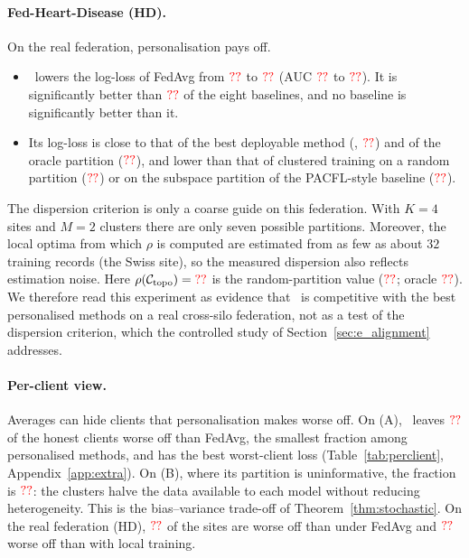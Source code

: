 \paragraph{Fed-Heart-Disease (HD).}
On the real federation, personalisation pays off.
\begin{itemize}[leftmargin=1.2em,itemsep=2pt]
  \item \ptopofl\ lowers the log-loss of FedAvg from $\textcolor{red}{??}$ to $\textcolor{red}{??}$ (AUC
    $\textcolor{red}{??}$ to $\textcolor{red}{??}$). It is significantly better than $\textcolor{red}{??}$ of
    the eight baselines, and no baseline is significantly better than it.
  \item Its log-loss is close to that of the best deployable method (\ResHDBest,
    $\textcolor{red}{??}$) and of the oracle partition ($\textcolor{red}{??}$), and lower than that of
    clustered training on a random partition ($\textcolor{red}{??}$) or on the subspace partition
    of the PACFL-style baseline ($\textcolor{red}{??}$).
\end{itemize}
The dispersion criterion is only a coarse guide on this federation. With $K=4$ sites and
$M=2$ clusters there are only seven possible partitions. Moreover, the local optima from which
$\rho$ is computed are estimated from as few as about $32$ training records (the Swiss site),
so the measured dispersion also reflects estimation noise. Here
$\rho(\mathcal{C}_{\mathrm{topo}})=\textcolor{red}{??}$ is \ResHDRhoCmp{} the random-partition value
($\textcolor{red}{??}$; oracle $\textcolor{red}{??}$). We therefore read this experiment as evidence that
\ptopofl\ is competitive with the best personalised methods on a real cross-silo federation,
not as a test of the dispersion criterion, which the controlled study of
Section~\ref{sec:e_alignment} addresses.

\paragraph{Per-client view.}
Averages can hide clients that personalisation makes worse off. On (A), \ptopofl\ leaves
$\textcolor{red}{??}$ of the honest clients worse off than FedAvg, the smallest fraction among
personalised methods, and has the best worst-client loss (Table~\ref{tab:perclient},
Appendix~\ref{app:extra}). On (B), where its partition is uninformative, the fraction is
$\textcolor{red}{??}$: the clusters halve the data available to each model without reducing
heterogeneity. This is the bias--variance trade-off of Theorem~\ref{thm:stochastic}. On the real federation (HD), $\textcolor{red}{??}$ of the sites are worse off than
under FedAvg and $\textcolor{red}{??}$ worse off than with local training.

